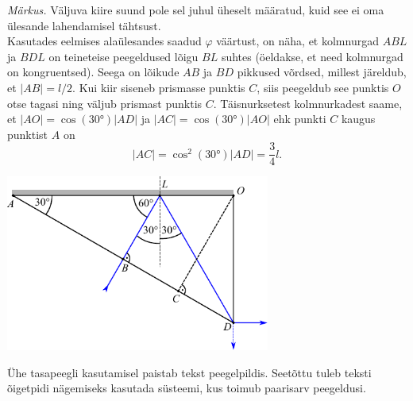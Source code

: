\emph{Märkus.} Väljuva kiire suund pole sel juhul üheselt määratud, kuid see ei oma ülesande lahendamisel tähtsust.\\
Kasutades eelmises alaülesandes saadud $\varphi$ väärtust, on näha, et kolmnurgad $ABL$ ja $BDL$ on teineteise peegeldused lõigu $BL$ suhtes (öeldakse, et need kolmnurgad on kongruentsed). Seega on lõikude $AB$ ja $BD$ pikkused võrdsed, millest järeldub, et $|AB|=l/2$. Kui kiir siseneb prismasse punktis $C$, siis peegeldub see punktis $O$ otse tagasi ning väljub prismast punktis $C$. Täisnurksetest kolmnurkadest saame, et $|AO|=\cos(\ang{30})|AD|$ ja $|AC|=\cos(\ang{30})|AO|$ ehk punkti $C$ kaugus punktist $A$ on 
\[
|AC|=\cos^2(\ang{30})|AD|=\frac{3}{4}l.
\]

\begin{center}
 \includegraphics[width=0.65\textwidth]{2014-v3g-04-periskoopprillid_lahendus_joonis3.pdf}
\end{center}

\osa Ühe tasapeegli kasutamisel paistab tekst peegelpildis. Seetõttu tuleb teksti õigetpidi nägemiseks kasutada süsteemi, kus toimub paarisarv peegeldusi.

